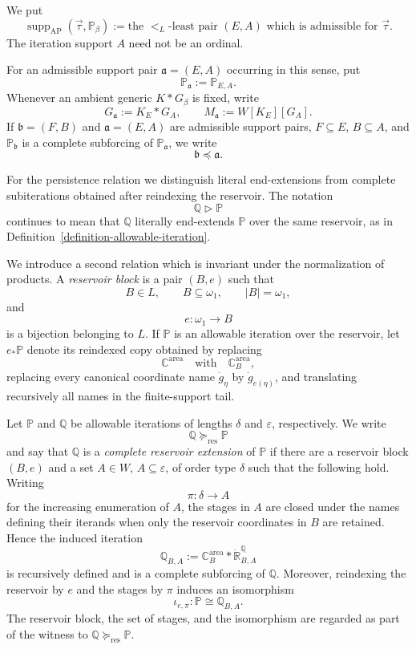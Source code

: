 \documentclass[a4paper,11pt]{article}
\newcommand{\forceP}{\mathbb{P}}
\newcommand{\forceQ}{\mathbb{Q}}
\newcommand{\forceR}{\mathbb{R}}
\newcommand{\forceC}{\mathbb{C}}
\begin{document}
We put
\[
   \operatorname{supp}_{\mathrm{AP}}(\vec\tau,\forceP_\beta)
   :=\text{the }<_L\text{-least pair }(E,A)
      \text{ which is admissible for }\vec\tau.
\]
The iteration support $A$ need not be an ordinal.

For an admissible support pair $\mathfrak a=(E,A)$ occurring in this sense, put
\[
   \forceP_{\mathfrak a}:=\forceP_{E,A}.
\]
Whenever an ambient generic $K*G_\beta$ is fixed, write
\[
   G_{\mathfrak a}:=K_E*G_A,
   \qquad
   M_{\mathfrak a}:=W[K_E][G_A].
\]
If $\mathfrak b=(F,B)$ and $\mathfrak a=(E,A)$ are admissible support pairs,
$F\subseteq E$, $B\subseteq A$, and $\forceP_{\mathfrak b}$ is a complete
subforcing of $\forceP_{\mathfrak a}$, we write
\[
   \mathfrak b\preccurlyeq\mathfrak a.
\]

For the persistence relation we distinguish literal end-extensions from complete subiterations obtained after reindexing the reservoir.  The notation
\[
   \forceQ\triangleright\forceP
\]
continues to mean that $\forceQ$ literally end-extends $\forceP$ over the same reservoir, as in Definition~\ref{definition-allowable-iteration}.

We introduce a second relation which is invariant under the normalization of products.  A \emph{reservoir block} is a pair $(B,e)$ such that
\[
   B\in L,\qquad B\subseteq\omega_1,\qquad |B|=\omega_1,
\]
and
\[
   e:\omega_1\longrightarrow B
\]
is a bijection belonging to $L$.  If $\forceP$ is an allowable iteration over the reservoir, let $e_*\forceP$ denote its reindexed copy obtained by replacing
\[
   \forceC^{\mathrm{area}}
   \quad\text{with}\quad
   \forceC^{\mathrm{area}}_B,
\]
replacing every canonical coordinate name $\dot g_\eta$ by $\dot g_{e(\eta)}$, and translating recursively all names in the finite-support tail.

Let $\forceP$ and $\forceQ$ be allowable iterations of lengths $\delta$ and $\varepsilon$, respectively.  We write
\[
   \forceQ\succeq_{\mathrm{res}}\forceP
\]
and say that $\forceQ$ is a \emph{complete reservoir extension} of $\forceP$ if there are a reservoir block $(B,e)$ and a set $A\in W$, $A\subseteq\varepsilon$, of order type $\delta$ such that the following hold.  Writing
\[
   \pi:\delta\longrightarrow A
\]
for the increasing enumeration of $A$, the stages in $A$ are closed under the names defining their iterands when only the reservoir coordinates in $B$ are retained.  Hence the induced iteration
\[
   \forceQ_{B,A}
   :=\forceC^{\mathrm{area}}_B*\dot{\forceR}^{\forceQ}_{B,A}
\]
is recursively defined and is a complete subforcing of $\forceQ$.  Moreover, reindexing the reservoir by $e$ and the stages by $\pi$ induces an isomorphism
\[
   \iota_{e,\pi}:\forceP\cong\forceQ_{B,A}.
\]
The reservoir block, the set of stages, and the isomorphism are regarded as part of the witness to
$\forceQ\succeq_{\mathrm{res}}\forceP$.
\end{document}
